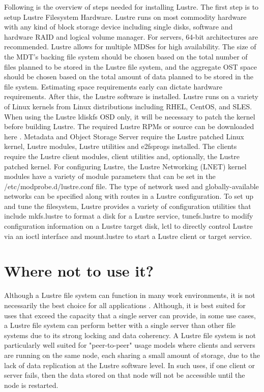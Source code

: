 \documentclass[9pt,twocolumn,twoside]{../../styles/osajnl}
\begin{document}
Following is the overview of steps needed for installing Lustre.  The
first step is to setup Lustre Filesystem Hardware. Lustre runs on most
commodity hardware with any kind of block storage device including
single disks, software and hardware RAID and logical volume
manager. For servers, 64-bit architectures are recommended. Lustre
allows for multiple MDSes for high availability. The size of the MDT’s
backing file system should be chosen based on the total number of
files planned to be stored in the Lustre file system, and the
aggregate OST space should be chosen based on the total amount of data
planned to be stored in the file system. Estimating space requirements
early can dictate hardware requirements. After this, the Lustre
software is installed. Lustre runs on a variety of Linux kernels from
Linux distributions including RHEL, CentOS, and SLES.  When using the
Lustre ldiskfs OSD only, it will be necessary to patch the kernel
before building Lustre. The required Lustre RPMs or source can be
downloaded here \cite{www-download}. Metadata and Object Storage
Server require the Lustre patched Linux kernel, Lustre modules, Lustre
utilities and e2fsprogs installed. The clients require the Lustre
client modules, client utilities and, optionally, the Lustre patched
kernel. For configuring Lustre, the Lustre Networking (LNET) kernel
modules have a variety of module parameters that can be set in the
/etc/modprobe.d/lustre.conf file. The type of network used and
globally-available networks can be specified along with routes in a
Lustre configuration. To set up and tune the filesystem, Lustre
provides a variety of configuration utilities that include mkfs.lustre
to format a disk for a Lustre service, tunefs.lustre to modify
configuration information on a Lustre target disk, lctl to directly
control Lustre via an ioctl interface and mount.lustre to start a
Lustre client or target service.

\section{Where not to use it?}

Although a Lustre file system can function in many work environments,
it is not necessarily the best choice for all applications
\cite{www-manual}. Although, it is best suited for uses that exceed
the capacity that a single server can provide, in some use cases, a
Lustre file system can perform better with a single server than other
file systems due to its strong locking and data coherency. A Lustre
file system is not particularly well suited for "peer-to-peer" usage
models where clients and servers are running on the same node, each
sharing a small amount of storage, due to the lack of data replication
at the Lustre software level. In such uses, if one client or server
fails, then the data stored on that node will not be accessible until
the node is restarted.
\end{document}
